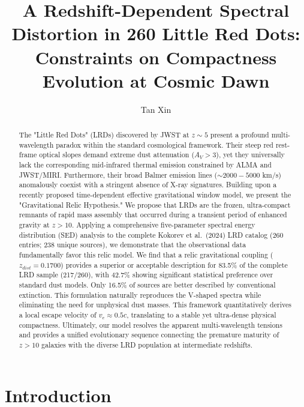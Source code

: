 \documentclass[twocolumn]{aastex631}
\begin{document}
\title{A Redshift-Dependent Spectral Distortion in 260 Little Red Dots: Constraints on Compactness Evolution at Cosmic Dawn}

\author{Tan Xin}

\begin{abstract}
The "Little Red Dots" (LRDs) discovered by JWST at $z \sim 5$ present a profound multi-wavelength paradox within the standard cosmological framework. Their steep red rest-frame optical slopes demand extreme dust attenuation ($A_V > 3$), yet they universally lack the corresponding mid-infrared thermal emission constrained by ALMA and JWST/MIRI. Furthermore, their broad Balmer emission lines ($\sim 2000-5000$ km/s) anomalously coexist with a stringent absence of X-ray signatures. Building upon a recently proposed time-dependent effective gravitational window model, we present the "Gravitational Relic Hypothesis." We propose that LRDs are the frozen, ultra-compact remnants of rapid mass assembly that occurred during a transient period of enhanced gravity at $z > 10$. Applying a comprehensive five-parameter spectral energy distribution (SED) analysis to the complete Kokorev et al.~(2024) LRD catalog (260 entries; 238 unique sources), we demonstrate that the observational data fundamentally favor this relic model. We find that a relic gravitational coupling ($z_{dist} = 0.1700$) provides a superior or acceptable description for 83.5\% of the complete LRD sample (217/260), with 42.7\% showing significant statistical preference over standard dust models. Only 16.5\% of sources are better described by conventional extinction. This formulation naturally reproduces the V-shaped spectra while eliminating the need for unphysical dust masses. This framework quantitatively derives a local escape velocity of $v_e \approx 0.5c$, translating to a stable yet ultra-dense physical compactness. Ultimately, our model resolves the apparent multi-wavelength tensions and provides a unified evolutionary sequence connecting the premature maturity of $z > 10$ galaxies with the diverse LRD population at intermediate redshifts.
\end{abstract}


\section{Introduction} \label{sec:intro}
\end{document}
